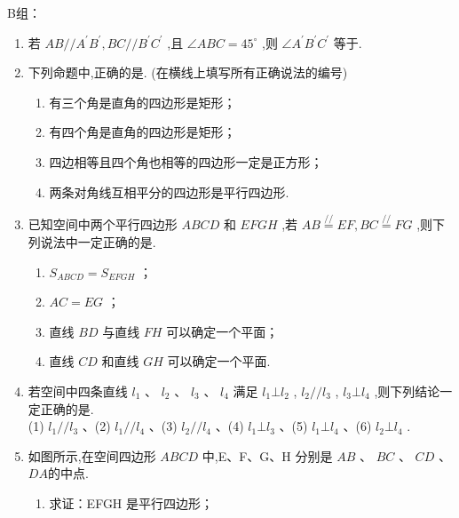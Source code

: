 B组：
\begin{enumerate}
    \item 若 $ {AB}//{A}^{\prime }{B}^{\prime },{BC}//{B}^{\prime }{C}^{\prime } $ ,且 $ \angle {ABC} = {45}^{ \circ  } $ ,则 $ \angle {A}^{\prime }{B}^{\prime }{C}^{\prime } $ 等于.
    
    \item 下列命题中,正确的是. (在横线上填写所有正确说法的编号)
    \begin{enumerate}
        \item 有三个角是直角的四边形是矩形；
        \item 有四个角是直角的四边形是矩形；
        \item 四边相等且四个角也相等的四边形一定是正方形；
        \item 两条对角线互相平分的四边形是平行四边形.
    \end{enumerate}
    

    \item 已知空间中两个平行四边形 $ {ABCD} $ 和 $ {EFGH} $ ,若 $ {AB}\overset{//}{ = }{EF},{BC}\overset{//}{ = }{FG} $ ,则下列说法中一定正确的是.
    \begin{enumerate}
        \item  $ {S}_{ABCD} = {S}_{EFGH} $ ；
        \item $ {AC} = {EG} $ ；
        \item 直线 $ {BD} $ 与直线 $ {FH} $ 可以确定一个平面；
        \item 直线 $ {CD} $ 和直线 $ {GH} $ 可以确定一个平面.
    \end{enumerate}

    \item 若空间中四条直线 $ {l}_{1} $ 、 $ {l}_{2} $ 、 $ {l}_{3} $ 、 $ {l}_{4} $ 满足 $ {l}_{1}\bot {l}_{2} $ , $ {l}_{2}//{l}_{3} $ , $ {l}_{3}\bot {l}_{4} $ ,则下列结论一定正确的是.\\
    (1) $ {l}_{1}//{l}_{3} $ 、(2) $ {l}_{1}//{l}_{4} $ 、(3) $ {l}_{2}//{l}_{4} $ 、(4) $ {l}_{1}\bot {l}_{3} $ 、(5) $ {l}_{1}\bot {l}_{4} $ 、(6) $ {l}_{2}\bot {l}_{4} $ .
    
    \item 如图所示,在空间四边形 $ {{ABCD}} $ 中,E、F、G、H 分别是 $ {{AB}} $ 、 $ {{BC}} $ 、 $ {{CD}} $ 、 $ {{DA}} $的中点.
    \begin{enumerate}
        \item 求证：EFGH 是平行四边形；
        \begin{center}
    

\end{center}
\end{enumerate}
\end{enumerate}
